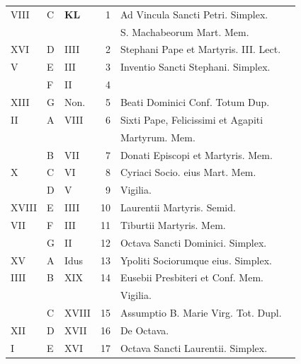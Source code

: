 \begin{center}
\begin{tabular}{l | l | l | r | l l}
\color{Red} VIII & C & \textbf{\color{Red} K\color{Blue}L} & 1 & Ad Vincula Sancti Petri. Simplex. & \color{Red} \\
 &  & &  & \multicolumn{2}{l}{\quad S. Machabeorum Mart. Mem. \color{Red}} \\
\color{Red} XVI & D & \color{Red} IIII & 2 & \color{Red} Stephani Pape et Martyris. III. Lect. \\
\color{Red} V & E & \color{Red} III & 3 & \color{Red} Inventio Sancti Stephani. Simplex. \\
\color{Red}  & F & \color{Red} II & 4 & & \color{Red} \\
\color{Red} XIII & G & \color{Red} Non. & 5 & Beati Dominici Conf. Totum Dup. & \color{Red} \\
\color{Red} II & \color{Red} A & \color{Red} VIII & 6 & \multicolumn{2}{l}{Sixti Pape, Felicissimi et Agapiti}\\
 &  & &  & \quad Martyrum. Mem. \color{Red} \\
\color{Red}  & B & \color{Red} VII & 7 & Donati Episcopi et Martyris. Mem. & \color{Red} \\
\color{Red} X & C & \color{Red} VI & 8 & Cyriaci Socio. eius Mart. Mem. & \color{Red} \\
\color{Red}  & D & \color{Red} V & 9 & \qquad \color{Red} Vigilia. \\
\color{Red} XVIII & E & \color{Red} IIII & 10 & \color{Red} Laurentii Martyris. Semid. & \color{Red} \\
\color{Red} VII & F & \color{Red} III & 11 & Tiburtii Martyris. Mem. & \color{Red} \\
\color{Red}  & G & \color{Red} II & 12 & Octava Sancti Dominici. Simplex. & \color{Red} \\
\color{Red} XV & \color{Red} A & \color{Red} Idus & 13 & Ypoliti Sociorumque eius. Simplex. & \color{Red} \\
\color{Red} IIII & B & \color{Red} XIX & 14 & Eusebii Presbiteri et Conf. Mem. & \\
 &  & &  & \qquad \color{Red} Vigilia. \\
\color{Red}  & C & \color{Red} XVIII & 15 & \multicolumn{2}{l}{\color{Red} Assumptio B. Marie Virg. Tot. Dupl.} \color{Red} \\
\color{Red} XII & D & \color{Red} XVII & 16 & De Octava. & \color{Red} \\
\color{Red} I & E & \color{Red} XVI & 17 & Octava Sancti Laurentii. Simplex. & \color{Red} \\

\end{tabular}
\end{center}
